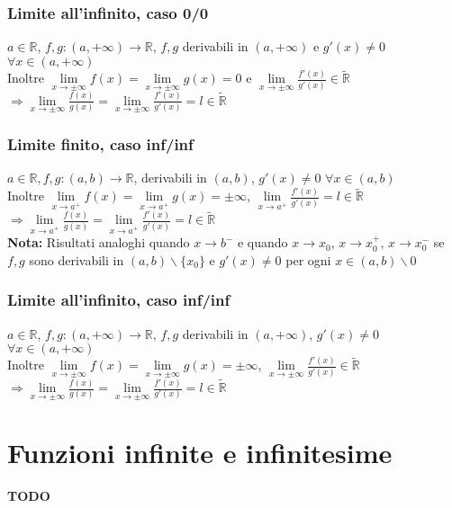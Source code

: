 \documentclass{article}
\begin{document}
\subsubsection{Limite all'infinito, caso 0/0}
$a \in \mathbb{R}$, $f,g: (a,+\infty) \to \mathbb{R}$, $f,g$ derivabili in $(a,+\infty)$ e $g'(x) \neq 0$ $\forall x \in (a,+\infty)$\\
Inoltre $\lim\limits_ {x \to \pm\infty} f(x) = \lim\limits_ {x \to \pm\infty} g(x) = 0$ e $\lim\limits_ {x \to \pm\infty} \frac{f'(x)}{g'(x)} \in \tilde{\mathbb{R}}$\\
$\Rightarrow \lim\limits_ {x \to \pm\infty} \frac{f(x)}{g(x)} = \lim\limits_ {x \to \pm\infty} \frac{f'(x)}{g'(x)} = l \in \tilde{\mathbb{R}}$ 

\subsubsection{Limite finito, caso inf/inf}
$a \in \mathbb{R}, f,g: (a, b) \to \mathbb{R}$, derivabili in $(a, b)$, $g'(x) \neq 0$ $\forall x \in (a,b)$\\
Inoltre $\lim\limits_ {x \to a^+} f(x) = \lim\limits_ {x \to a^+} g(x) = \pm\infty$, $\lim\limits_ {x\to a^+} \frac{f'(x)}{g'(x)} = l \in \tilde{\mathbb{R}}$\\
$\Rightarrow \lim\limits_ {x \to a^+} \frac{f(x)}{g(x)} = \lim\limits_ {x \to a^+} \frac{f'(x)}{g'(x)} = l \in \tilde{\mathbb{R}}$\\
\textbf{Nota:} Risultati analoghi quando $x \to b^-$ e quando $x \to x_0$, $x \to x_0^+$, $x \to x_0^-$ se $f,g$ sono derivabili in $(a,b) \backslash \{x_0\}$ e $g'(x) \neq 0$ per ogni $x \in (a,b) \backslash 0$ 
\subsubsection{Limite all'infinito, caso inf/inf}
$a \in \mathbb{R}$, $f,g: (a, +\infty) \to \mathbb{R}$, $f,g$ derivabili in $(a, +\infty)$, $g'(x) \neq 0$ $\forall x \in (a, +\infty)$\\
Inoltre $\lim\limits_ {x \to \pm\infty} f(x) = \lim\limits_ {x \to \pm\infty} g(x) = \pm\infty$, $\lim\limits_ {x \to \pm\infty} \frac{f'(x)}{g'(x)} \in \tilde{\mathbb{R}}$\\
$\Rightarrow \lim\limits_ {x \to \pm \infty}\frac{f(x)}{g(x)} = \lim\limits_ {x \to \pm \infty} \frac{f'(x)}{g'(x)} = l \in \tilde{\mathbb{R}}$

\section{Funzioni infinite e infinitesime}
\textbf{TODO}
\end{document}
